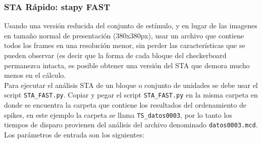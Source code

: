 \documentclass[10pt]{article}
\begin{document}
\subsubsection{ STA Rápido: stapy FAST } 

Usando una versión reducida del conjunto de estímulo, y en lugar de las imagenes en tamaño normal de presentación (380x380px), usar un archivo que contiene todos los frames en una resolución menor, sin perder las características que se pueden observar (es decir que la forma de cada bloque del checkerboard permanezca intacta, es posible obtener una versión del STA que demora mucho menos en el cálculo. \\

Para ejecutar el análisis STA de un bloque o conjunto de unidades se debe usar el script \verb+STA_FAST.py+. 
Copiar y pegar el script \verb+STA_FAST.py+ en la misma carpeta en donde se encuentra la carpeta que contiene los resultados del ordenamiento de spikes, en este ejemplo la carpeta se llama \verb+TS_datos0003+, por lo tanto los tiempos de disparo provienen del análisis del archivo denominado \verb+datos0003.mcd+. Los parámetros de entrada son los siguientes:\\
\end{document}
